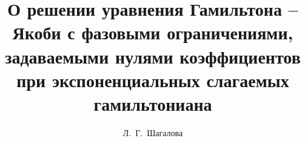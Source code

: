 
\usepackage{todonotes} %

\usepackage[russian]{nla}

%
%


%




%
\fi

\title{О решении уравнения Гамильтона -- Якоби с фазовыми ограничениями, задаваемыми нулями коэффициентов при экспоненциальных слагаемых гамильтониана}%
\author{Л.~Г.~Шагалова%
} %


\maketitle

